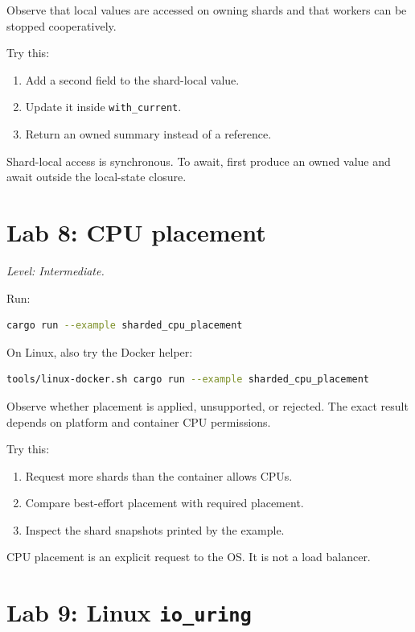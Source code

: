 Observe that local values are accessed on owning shards and that workers can be
stopped cooperatively.

Try this:

\begin{enumerate}
    \item Add a second field to the shard-local value.
    \item Update it inside \texttt{with\_current}.
    \item Return an owned summary instead of a reference.
\end{enumerate}

Shard-local access is synchronous. To await, first produce an
owned value and await outside the local-state closure.

\section{Lab 8: CPU placement}

\textit{Level: Intermediate.}

Run:

\begin{lstlisting}[language=bash,caption={CPU placement example}]
cargo run --example sharded_cpu_placement
\end{lstlisting}

On Linux, also try the Docker helper:

\begin{lstlisting}[language=bash,caption={Linux CPU placement through Docker}]
tools/linux-docker.sh cargo run --example sharded_cpu_placement
\end{lstlisting}

Observe whether placement is applied, unsupported, or rejected. The exact
result depends on platform and container CPU permissions.

Try this:

\begin{enumerate}
    \item Request more shards than the container allows CPUs.
    \item Compare best-effort placement with required placement.
    \item Inspect the shard snapshots printed by the example.
\end{enumerate}

CPU placement is an explicit request to the OS. It is not a load
balancer.

\section{Lab 9: Linux \texttt{io\_uring}}

